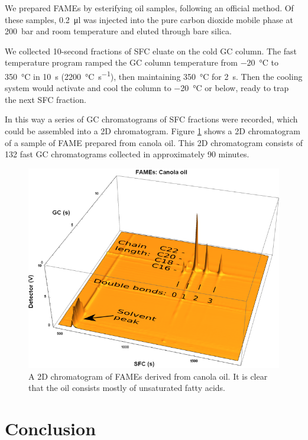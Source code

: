 \documentclass[aip,rsi,preprint,graphicx]{revtex4-1} %
\begin{document}
We prepared FAMEs by esterifying oil samples, following an official
method\cite{AOCS2017}. Of these samples, \SI{0.2}{\micro\litre} was injected
into the pure carbon dioxide mobile phase at \SI{200}{\bar} and room temperature
and eluted through bare silica.

We collected 10-second fractions of SFC eluate on the cold GC column. The fast
temperature program ramped the GC column temperature from \SI{-20}{\celsius} to
\SI{350}{\celsius} in \SI{10}{s} (\SI{2200}{\celsius\per\second}), then
maintaining \SI{350}{\celsius} for \SI{2}{\second}. Then the cooling system
would activate and cool the column to \SI{-20}{\celsius} or below, ready to trap
the next SFC fraction.

In this way a series of GC chromatograms of SFC fractions were recorded, which
could be assembled into a 2D chromatogram. Figure \ref{fig:2DChromatogram} shows
a 2D chromatogram of a sample of FAME prepared from canola oil. This 2D
chromatogram consists of 132 fast GC chromatograms collected in approximately 90
minutes.

\begin{figure}
\includegraphics[width=\textwidth]{./Figures/Interpretation.png}%

\caption{\label{fig:2DChromatogram}A 2D chromatogram of FAMEs derived from
canola oil. It is clear that the oil consists mostly of unsaturated fatty
acids.}%

\end{figure}

\section{Conclusion}
\end{document}
